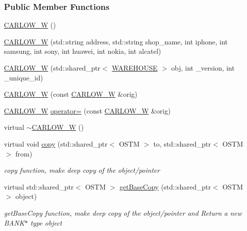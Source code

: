 \subsubsection*{Public Member Functions}
\begin{DoxyCompactItemize}
\item 
\hyperlink{class_c_a_r_l_o_w___w_a8ae6ca6f4db7ea5240322fd27824c55a}{C\+A\+R\+L\+O\+W\+\_\+W} ()
\item 
\hyperlink{class_c_a_r_l_o_w___w_aa13cfb47255f935a3b27708b68e52129}{C\+A\+R\+L\+O\+W\+\_\+W} (std\+::string address, std\+::string shop\+\_\+name, int iphone, int samsung, int sony, int huawei, int nokia, int alcatel)
\item 
\hyperlink{class_c_a_r_l_o_w___w_ad3b772ca2d09eba4a273cb0c7cece747}{C\+A\+R\+L\+O\+W\+\_\+W} (std\+::shared\+\_\+ptr$<$ \hyperlink{class_w_a_r_e_h_o_u_s_e}{W\+A\+R\+E\+H\+O\+U\+SE} $>$ obj, int \+\_\+version, int \+\_\+unique\+\_\+id)
\item 
\hyperlink{class_c_a_r_l_o_w___w_a267a2792c59f475740a68953c8437205}{C\+A\+R\+L\+O\+W\+\_\+W} (const \hyperlink{class_c_a_r_l_o_w___w}{C\+A\+R\+L\+O\+W\+\_\+W} \&orig)
\item 
\hyperlink{class_c_a_r_l_o_w___w}{C\+A\+R\+L\+O\+W\+\_\+W} \hyperlink{class_c_a_r_l_o_w___w_a38c83795abf1751b3e122c74494f4586}{operator=} (const \hyperlink{class_c_a_r_l_o_w___w}{C\+A\+R\+L\+O\+W\+\_\+W} \&orig)
\item 
virtual \hyperlink{class_c_a_r_l_o_w___w_aa628d46e58dfd0517f24499eca88138b}{$\sim$\+C\+A\+R\+L\+O\+W\+\_\+W} ()
\item 
virtual void \hyperlink{class_c_a_r_l_o_w___w_ac91cb7cbae77752e334e273b97fb988b}{copy} (std\+::shared\+\_\+ptr$<$ O\+S\+TM $>$ to, std\+::shared\+\_\+ptr$<$ O\+S\+TM $>$ from)
\begin{DoxyCompactList}\small\item\em copy function, make deep copy of the object/pointer \end{DoxyCompactList}\item 
virtual std\+::shared\+\_\+ptr$<$ O\+S\+TM $>$ \hyperlink{class_c_a_r_l_o_w___w_a1a76566c3a7c01cf469007741dac6b97}{get\+Base\+Copy} (std\+::shared\+\_\+ptr$<$ O\+S\+TM $>$ object)
\begin{DoxyCompactList}\small\item\em get\+Base\+Copy function, make deep copy of the object/pointer and Return a new B\+A\+N\+K$\ast$ type object \end{DoxyCompactList}\item 

\end{DoxyCompactItemize}
